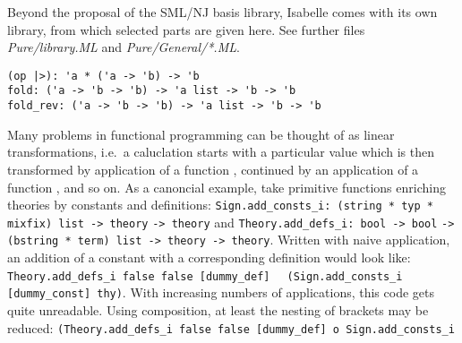 \begin{isabellebody}
\begin{isamarkuptext}
\begin{description}
  \end{description}%
\end{isamarkuptext}%
\isamarkuptrue%
%
\isamarkuptrue%
%
\begin{isamarkuptext}%
Beyond the proposal of the SML/NJ basis library, Isabelle comes
  with its own library, from which selected parts are given here.
  See further files \emph{Pure/library.ML} and \emph{Pure/General/*.ML}.%
\end{isamarkuptext}%
\isamarkuptrue%
%
\isamarkuptrue%
%
\isadelimmlref
%
\endisadelimmlref
%
\isatagmlref
%
\begin{isamarkuptext}%
\begin{mldecls}
  \verb|(op |\verb,|,\verb|>): 'a * ('a -> 'b) -> 'b| \\
  \verb|fold: ('a -> 'b -> 'b) -> 'a list -> 'b -> 'b| \\
  \verb|fold_rev: ('a -> 'b -> 'b) -> 'a list -> 'b -> 'b| \\
  \end{mldecls}%
\end{isamarkuptext}%
\isamarkuptrue%
%
\endisatagmlref
{\isafoldmlref}%
%
\isadelimmlref
%
\endisadelimmlref
%
\isadelimML
%
\endisadelimML
%
\isatagML
%
\endisatagML
{\isafoldML}%
%
\isadelimML
%
\endisadelimML
%
\begin{isamarkuptext}%
Many problems in functional programming can be thought of
  as linear transformations, i.e.~a caluclation starts with a
  particular value  which is then transformed
  by application of a function ,
  continued by an application of a function ,
  and so on.  As a canoncial example, take primitive functions enriching
  theories by constants and definitions:
  \verb|Sign.add_consts_i: (string * typ * mixfix) list -> theory|\isasep\isanewline%
\verb|-> theory|
  and \verb|Theory.add_defs_i: bool -> bool|\isasep\isanewline%
\verb|-> (bstring * term) list -> theory -> theory|.
  Written with naive application, an addition of a constant with
  a corresponding definition would look like:
  \verb|Theory.add_defs_i false false [dummy_def]|\isasep\isanewline%
\verb|  (Sign.add_consts_i [dummy_const] thy)|.
  With increasing numbers of applications, this code gets quite unreadable.
  Using composition, at least the nesting of brackets may be reduced:
  \verb|(Theory.add_defs_i false false [dummy_def] o Sign.add_consts_i|\isasep\isanewline%

\end{isamarkuptext}
\end{isabellebody}
